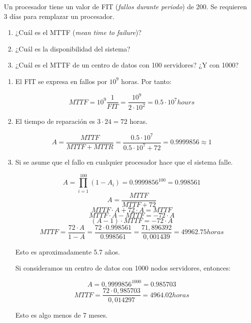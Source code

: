 \begin{acexercise}\end{acexercise}

Un procesador tiene un valor de FIT (\emph{fallos durante periodo}) de 200.
Se requieren 3 días para remplazar un procesador.

\begin{enumerate}

\item ¿Cuál es el MTTF (\emph{mean time to failure})?

\item ¿Cuál es la disponibilidad del sistema?

\item ¿Cuál es el MTTF de un centro de datos con 100 servidores? ¿Y con 1000?

\end{enumerate}

\begin{acsolution}\end{acsolution}

\begin{enumerate}

\item El FIT se expresa en fallos por $10^9$ horas. Por tanto:

\[MTTF = 10^9 \frac{1}{FIT} = \frac{10^9}{2 \cdot 10^2} = 0.5 \cdot 10^7 hours\]

\item El tiempo de reparación es $3 \cdot 24 = 72$ horas.

\[
A = \frac{MTTF}{MTTF + MTTR} =
\frac{0.5 \cdot 10^7}{0.5 \cdot 10^7 + 72} =
0.9999856 \approx 1
\]

\item Si se asume que el fallo en cualquier procesador hace que el sistema falle.

\[
A = \prod_{i=1}^{100}(1 - A_i) = 0.9999856^{100} = 0.998561
\]
\[A = \frac{MTTF}{MTTF + 72} \]
\[MTTF \cdot A + 72 \cdot A = MTTF\]
\[MTTF \cdot A - MTTF = - 72 \cdot A\]
\[(A-1) \cdot MTTF = - 72 \cdot A\]
\[MTTF = \frac{72 \cdot A}{1 - A} = \frac{72 \cdot 0.998561}{0.998561} =
\frac{71,896392}{0,001439} =
49962.75 horas
\]

Esto es aproximadamente 5.7 años.

Si consideramos un centro de datos con 1000 nodos servidores, entonces:

\[A = 0,9999856^{1000} = 0.985703\]
\[MTTF = \frac{72 \cdot 0,985703}{0,014297} = 4964.02 horas\]

Esto es algo menos de 7 meses.

\end{enumerate}

